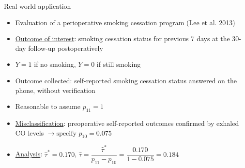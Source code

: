 \documentclass[12pt,aspectratio=169]{beamer}
\begin{document}
\begin{frame}{Real-world application}
\begin{itemize}
\item Evaluation of a perioperative smoking cessation program (Lee et al. 2013)


\item 

\underline{{\color{blue}Outcome of interest}}: smoking cessation status for previous 7 days at the 30-day follow-up {\color{dakglee}postoperatively}

\item

$Y=1$ if no smoking, $Y=0$ if still smoking

\item

\underline{{\color{blue}Outcome collected}}: {\color{cred}self-reported} smoking cessation status  answered on the phone, {\color{cred}without verification}

\pause

\item

Reasonable to assume $p_{11}=1$

\item

\underline{{\color{blue}Misclassification}}: {\color{dakglee}preoperative} self-reported outcomes  confirmed by  exhaled CO levels  $\rightarrow \text{specify}\,\,  p_{10}=0.075$


\item

\underline{{\color{blue}Analysis}}: $\hat\tau^\ast=0.170$, $\hat\tau=\dfrac{\hat\tau^\ast}{p_{11}-p_{10}}=\dfrac{0.170}{1-0.075}=0.184$

\end{itemize}
\end{frame}
\end{document}
